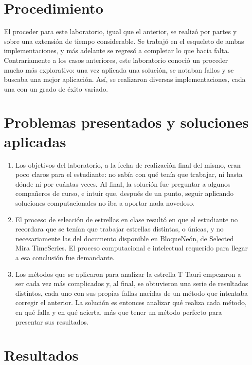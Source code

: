 \documentclass[10pt,twocolumn]{article}
\begin{document}
\section{Procedimiento}

El proceder para este laboratorio, igual que el anterior, se realizó por partes y sobre una extensión de tiempo considerable. 
Se trabajó en el esqueleto de ambas implementaciones, y más adelante se regresó a completar lo que hacía falta. Contrariamente a
los casos anteriores, este laboratorio conoció un proceder mucho más explorativo: una vez aplicada una solución, se notaban fallos 
y se buscaba una mejor aplicación. Así, se realizaron diversas implementaciones, cada una con un grado de éxito variado. 

\section{Problemas presentados y soluciones aplicadas}

\begin{enumerate}
    \item Los objetivos del laboratorio, a la fecha de realización final del mismo, eran poco claros para el estudiante: no sabía
    con qué tenía que trabajar, ni hasta dónde ni por cuántas veces. Al final, la solución fue preguntar a algunos compañeros 
    de curso, e intuir que, después de un punto, seguir aplicando soluciones computacionales no iba a aportar nada novedoso. 
    \item El proceso de selección de estrellas en clase resultó en que el estudiante no recordara que se tenían que trabajar
    estrellas distintas, o únicas, y no necesariamente las del documento disponible en BloqueNeón, de Selected Mira TimeSeries.
    El proceso computacional e intelectual requerido para llegar a esa conclusión fue demandante. 
    \item Los métodos que se aplicaron para analizar la estrella T Tauri empezaron a ser cada vez más complicados y, al final, 
    se obtuvieron una serie de resultados distintos, cada uno con sus propias fallas nacidas de un método que intentaba corregir
    el anterior. La solución es entonces analizar qué realiza cada método, en qué falla y en qué acierta, más que tener un método 
    perfecto para presentar sus resultados. 
\end{enumerate}


\section{Resultados}
\end{document}
